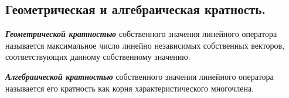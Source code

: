 \subsection{
    Геометрическая и алгебраическая кратность.
}

\begin{definition}
    \textbf{\textit{Геометрической кратностью}} собственного значения линейного оператора называется максимальное число линейно независимых собственных векторов, соответствующих данному собственному значению.
\end{definition}

\begin{definition}
    \textbf{\textit{Алгебраической кратностью}} собственного значения линейного оператора называется его кратность как корня характеристического многочлена.
\end{definition}

